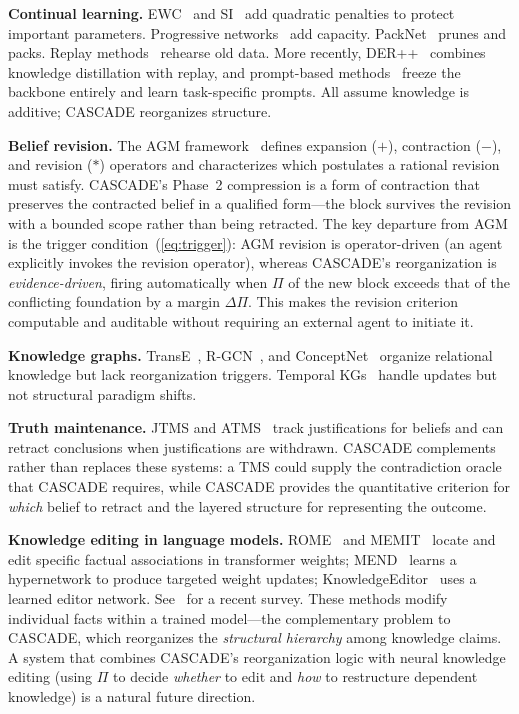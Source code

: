 \documentclass[11pt,a4paper]{article}
\theoremstyle{definition}
\newcommand{\tp}{\Pi}
\begin{document}
\textbf{Continual learning.} EWC~\citep{kirkpatrick2017overcoming} and
SI~\citep{zenke2017continual} add quadratic penalties to protect important parameters.
Progressive networks~\citep{rusu2016progressive} add capacity. PackNet~\citep{mallya2018packnet}
prunes and packs. Replay methods~\citep{chaudhry2019tiny,shin2017continual} rehearse
old data. More recently, DER++~\citep{buzzega2020dark} combines knowledge distillation
with replay, and prompt-based methods~\citep{wang2022learning,wang2022dualprompt}
freeze the backbone entirely and learn task-specific prompts. All assume knowledge is
additive; CASCADE reorganizes structure.

\textbf{Belief revision.} The AGM framework~\citep{alchourron1985logic,gardenfors1988knowledge}
defines expansion ($+$), contraction ($-$), and revision ($*$) operators and characterizes
which postulates a rational revision must satisfy. CASCADE's Phase~2 compression is a
form of contraction that preserves the contracted belief in a qualified form---the block
survives the revision with a bounded scope rather than being retracted. The key departure
from AGM is the trigger condition~(\ref{eq:trigger}): AGM revision is operator-driven
(an agent explicitly invokes the revision operator), whereas CASCADE's reorganization is
\emph{evidence-driven}, firing automatically when $\tp$ of the new block exceeds that
of the conflicting foundation by a margin $\Delta\tp$. This makes the revision criterion
computable and auditable without requiring an external agent to initiate it.

\textbf{Knowledge graphs.} TransE~\citep{bordes2013translating},
R-GCN~\citep{schlichtkrull2018modeling}, and ConceptNet~\citep{speer2017conceptnet}
organize relational knowledge but lack reorganization triggers. Temporal
KGs~\citep{trivedi2017know} handle updates but not structural paradigm shifts.

\textbf{Truth maintenance.} JTMS and ATMS~\citep{doyle1979truth,dekleer1986assumption}
track justifications for beliefs and can retract conclusions when justifications are
withdrawn. CASCADE complements rather than replaces these systems: a TMS could supply
the contradiction oracle that CASCADE requires, while CASCADE provides the quantitative
criterion for \emph{which} belief to retract and the layered structure for representing
the outcome.

\textbf{Knowledge editing in language models.}
ROME~\citep{meng2022locating} and MEMIT~\citep{meng2023memit} locate and edit
specific factual associations in transformer weights; MEND~\citep{mitchell2022mend}
learns a hypernetwork to produce targeted weight updates;
KnowledgeEditor~\citep{decao2021editing} uses a learned editor network.
See~\citet{yao2023editing} for a recent survey. These methods modify individual
facts within a trained model---the complementary problem to CASCADE, which
reorganizes the \emph{structural hierarchy} among knowledge claims. A system
that combines CASCADE's reorganization logic with neural knowledge editing
(using $\tp$ to decide \emph{whether} to edit and \emph{how} to restructure
dependent knowledge) is a natural future direction.
\end{document}
